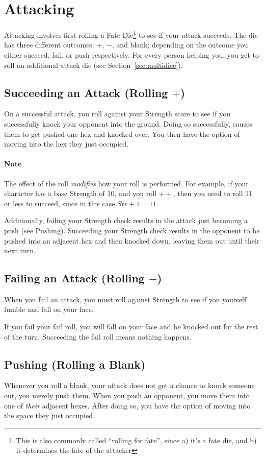 \section{Attacking} \label{attacking}
Attacking involves first rolling a Fate Die\footnote{This is also commonly called ``rolling for fate'', since a) it's a fate die, and b) it determines the fate of the attacker} to see if your attack succeeds.
The die has three different outcomes: $+$, $-$, and blank; depending on the outcome you either succeed, fail, or push respectively.
For every person helping you, you get to roll an additional attack die (see Section~\ref{sec:multidice}). 

\subsection{Succeeding an Attack (Rolling $+$)}
On a successful attack, you roll against your Strength score to see if you successfully knock your opponent into the ground. 
Doing so successfully, causes them to get pushed one hex and knocked over. 
You then have the option of moving into the hex they just occupied.

\paragraph{Note} The effect of the roll \textit{modifies} how your roll is performed. For example, if your character has a base Strength of 10, and you roll $++$, then you need to roll 11 or less to succeed, since in this case $Str+1=11$.

Additionally, failing your Strength check results in the attack just becoming a push (see Pushing).
Succeeding your Strength check results in the opponent to be pushed into an adjacent hex and then knocked down, leaving them out until their next turn.

\subsection{Failing an Attack (Rolling $-$)}
When you fail an attack, you must roll against Strength to see if you yourself fumble and fall on your face.

If you fail your fail roll, you will fall on your face and be knocked out for the rest of the turn. 
Succeeding the fail roll means nothing happens.

\subsection{Pushing (Rolling a Blank)}
Whenever you roll a blank, your attack does not get a chance to knock someone out, you merely push them. When you push an opponent, you move them into one of \textit{their} adjacent hexes. After doing so, you have the option of moving into the space they just occupied.

